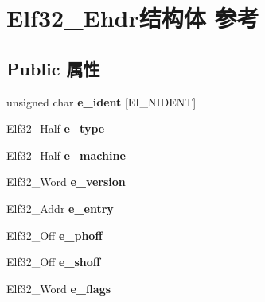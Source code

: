 \hypertarget{struct_elf32___ehdr}{}\section{Elf32\+\_\+\+Ehdr结构体 参考}
\label{struct_elf32___ehdr}
\subsection*{Public 属性}
\begin{DoxyCompactItemize}
\item 
\mbox{\label{struct_elf32___ehdr_aba47ac5e0af02d5668782f1fd5a7466c}} 
unsigned char {\bfseries e\+\_\+ident} \mbox{[}E\+I\+\_\+\+N\+I\+D\+E\+NT\mbox{]}
\item 
\mbox{\label{struct_elf32___ehdr_a49e40a791813c06e3b6ebcb53aef1bb8}} 
Elf32\+\_\+\+Half {\bfseries e\+\_\+type}
\item 
\mbox{\label{struct_elf32___ehdr_a19bca7faba9e5573814643efc3574c7b}} 
Elf32\+\_\+\+Half {\bfseries e\+\_\+machine}
\item 
\mbox{\label{struct_elf32___ehdr_aa27627bda53281221325df4dd782e800}} 
Elf32\+\_\+\+Word {\bfseries e\+\_\+version}
\item 
\mbox{\label{struct_elf32___ehdr_ab8a982696048d807017919b7d0145482}} 
Elf32\+\_\+\+Addr {\bfseries e\+\_\+entry}
\item 
\mbox{\label{struct_elf32___ehdr_a25c36fc010284a928604aae005b67ad1}} 
Elf32\+\_\+\+Off {\bfseries e\+\_\+phoff}
\item 
\mbox{\label{struct_elf32___ehdr_a00601af5187a1b3f8babfe9cddd95c15}} 
Elf32\+\_\+\+Off {\bfseries e\+\_\+shoff}
\item 
\mbox{\label{struct_elf32___ehdr_a87cf481be7917fafde0c4ecf78c8e574}} 
Elf32\+\_\+\+Word {\bfseries e\+\_\+flags}
\item 
\mbox{\label{struct_elf32___ehdr_a04c658023e50479eed64f6d1b00a2504}} 

\end{DoxyCompactItemize}

